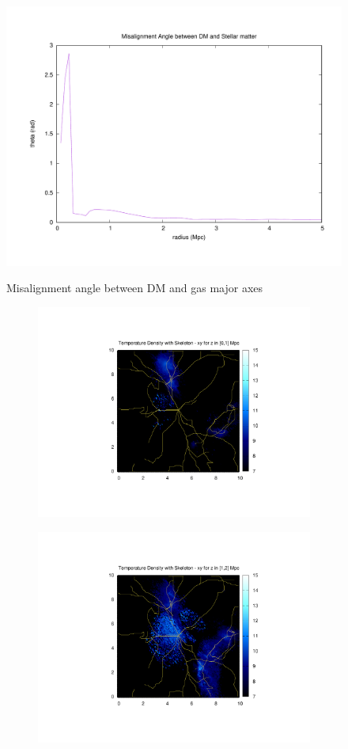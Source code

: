 \documentclass[journal]{IEEEtran}
\begin{document}
\begin{figure}[!t]
\centering
\includegraphics[width=0.5\linewidth]{GasDMAlign}
\label{fig:DMgasAlign}
\caption{Misalignment angle between DM and gas major axes}
\end{figure}

\begin{figure}[!t]
	\begin{subfigure}[t]{0.3\textwidth}
		\centering
		\includegraphics[width=\linewidth]{TempDenSkel01}
	\end{subfigure}
	\quad
	\begin{subfigure}[t]{0.3\textwidth}
		\centering
		\includegraphics[width=\linewidth]{TempDenSkel02}

\end{subfigure}
\end{figure}
\end{document}
